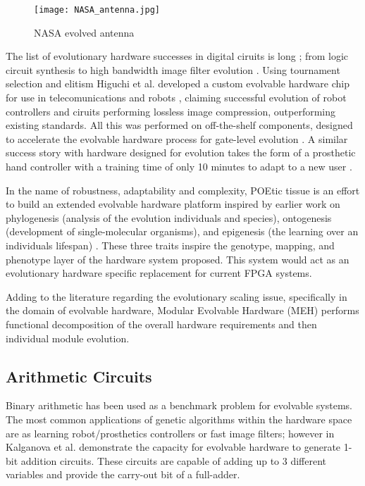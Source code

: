\begin{figure}
	\centering
	\texttt{[image: NASA\_antenna.jpg]}
	\caption{NASA evolved antenna \cite{Antenna}}
	\label{fig:antenna}
\end{figure}

The list of evolutionary hardware successes in digital ciruits is long \cite{Sekanina};
from logic circuit synthesis \cite{Vasicek2011} to high bandwidth image filter
evolution \cite{10.1007/3-540-46004-7_26}\cite{HybridFilter}.
Using tournament selection and elitism Higuchi et al.
developed a custom evolvable hardware chip for use in telecomunications and robots \cite{HiguchiRW},
claiming successful evolution of robot controllers and ciruits performing lossless image
compression, outperforming existing standards. All this was performed on
off-the-shelf components, designed to accelerate the evolvable hardware process
for gate-level evolution \cite{HiguchiRW}. A similar success story with hardware
designed for evolution takes the form of a prosthetic hand controller with
a training time of only 10 minutes to adapt to a new user \cite{Kajitani1999AnEH}.

In the name of robustness, adaptability and complexity, POEtic tissue
\cite{Tyrrell:2003:PTI:1766731.1766747} is
an effort to build an extended evolvable hardware platform inspired by
earlier work on phylogenesis (analysis of the evolution individuals and species),
ontogenesis (development of single-molecular organisms), and epigenesis
(the learning over an individuals lifespan) \cite{10.1007/3-540-63173-9_37}.
These three traits inspire the genotype, mapping, and phenotype layer of the
hardware system proposed. This system would act as an evolutionary hardware
specific replacement for current FPGA systems.

Adding to the literature regarding the evolutionary scaling issue, specifically
in the domain of evolvable hardware,
Modular Evolvable Hardware (MEH) \cite{1299561} performs functional decomposition
of the overall hardware requirements and then individual module evolution.

\subsection{Arithmetic Circuits}

Binary arithmetic has been used as a benchmark problem for evolvable systems.
The most common applications of genetic algorithms within the hardware space
are as learning robot/prosthetics controllers or fast image filters; however
in \cite{Miller_multiple-valuedcombinational} Kalganova et al. demonstrate the
capacity for evolvable hardware to generate 1-bit addition circuits. These
circuits are capable of adding up to 3 different variables and provide the carry-out
bit of a full-adder.

